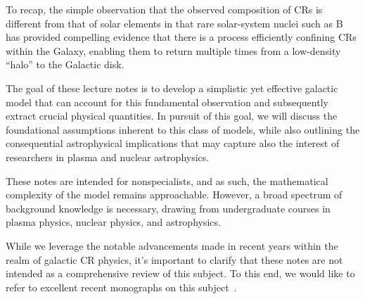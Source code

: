 To recap, the simple observation that the observed composition of CRs is different from that of solar elements in that rare solar-system nuclei such as B has provided compelling evidence that there is a process efficiently confining CRs within the Galaxy, enabling them to return multiple times from a low-density ``halo'' to the Galactic disk. 

The goal of these lecture notes is to develop a simplistic yet effective galactic model that can account for this fundamental observation and subsequently extract crucial physical quantities. 
%
In pursuit of this goal, we will discuss the foundational assumptions inherent to this class of models, while also outlining the consequential astrophysical implications that may capture also the interest of researchers in plasma and nuclear astrophysics.

These notes are intended for nonspecialists, and as such, the mathematical complexity of the model remains approachable. However, a broad spectrum of background knowledge is necessary, drawing from undergraduate courses in plasma physics, nuclear physics, and astrophysics.

While we leverage the notable advancements made in recent years within the realm of galactic CR physics, it's important to clarify that these notes are not intended as a comprehensive review of this subject.
%
To this end, we would like to refer to excellent recent monographs on this subject~\cite{Blasi2013aar,Zweibel2013pp,Grenier2015araa,Amato2018asr,Kachelriess2019ppnp,Gabici2019ijmpd}.
